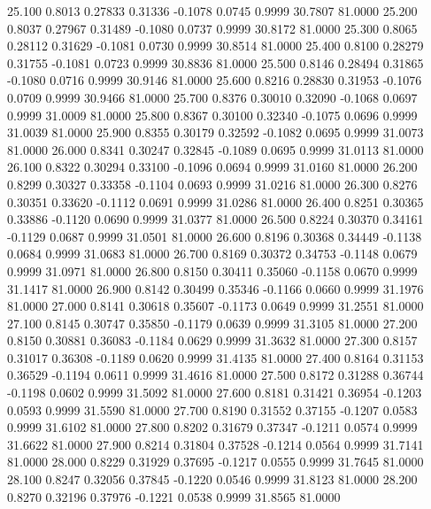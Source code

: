   25.100   0.8013   0.27833   0.31336  -0.1078   0.0745   0.9999  30.7807  81.0000
  25.200   0.8037   0.27967   0.31489  -0.1080   0.0737   0.9999  30.8172  81.0000
  25.300   0.8065   0.28112   0.31629  -0.1081   0.0730   0.9999  30.8514  81.0000
  25.400   0.8100   0.28279   0.31755  -0.1081   0.0723   0.9999  30.8836  81.0000
  25.500   0.8146   0.28494   0.31865  -0.1080   0.0716   0.9999  30.9146  81.0000
  25.600   0.8216   0.28830   0.31953  -0.1076   0.0709   0.9999  30.9466  81.0000
  25.700   0.8376   0.30010   0.32090  -0.1068   0.0697   0.9999  31.0009  81.0000
  25.800   0.8367   0.30100   0.32340  -0.1075   0.0696   0.9999  31.0039  81.0000
  25.900   0.8355   0.30179   0.32592  -0.1082   0.0695   0.9999  31.0073  81.0000
  26.000   0.8341   0.30247   0.32845  -0.1089   0.0695   0.9999  31.0113  81.0000
  26.100   0.8322   0.30294   0.33100  -0.1096   0.0694   0.9999  31.0160  81.0000
  26.200   0.8299   0.30327   0.33358  -0.1104   0.0693   0.9999  31.0216  81.0000
  26.300   0.8276   0.30351   0.33620  -0.1112   0.0691   0.9999  31.0286  81.0000
  26.400   0.8251   0.30365   0.33886  -0.1120   0.0690   0.9999  31.0377  81.0000
  26.500   0.8224   0.30370   0.34161  -0.1129   0.0687   0.9999  31.0501  81.0000
  26.600   0.8196   0.30368   0.34449  -0.1138   0.0684   0.9999  31.0683  81.0000
  26.700   0.8169   0.30372   0.34753  -0.1148   0.0679   0.9999  31.0971  81.0000
  26.800   0.8150   0.30411   0.35060  -0.1158   0.0670   0.9999  31.1417  81.0000
  26.900   0.8142   0.30499   0.35346  -0.1166   0.0660   0.9999  31.1976  81.0000
  27.000   0.8141   0.30618   0.35607  -0.1173   0.0649   0.9999  31.2551  81.0000
  27.100   0.8145   0.30747   0.35850  -0.1179   0.0639   0.9999  31.3105  81.0000
  27.200   0.8150   0.30881   0.36083  -0.1184   0.0629   0.9999  31.3632  81.0000
  27.300   0.8157   0.31017   0.36308  -0.1189   0.0620   0.9999  31.4135  81.0000
  27.400   0.8164   0.31153   0.36529  -0.1194   0.0611   0.9999  31.4616  81.0000
  27.500   0.8172   0.31288   0.36744  -0.1198   0.0602   0.9999  31.5092  81.0000
  27.600   0.8181   0.31421   0.36954  -0.1203   0.0593   0.9999  31.5590  81.0000
  27.700   0.8190   0.31552   0.37155  -0.1207   0.0583   0.9999  31.6102  81.0000
  27.800   0.8202   0.31679   0.37347  -0.1211   0.0574   0.9999  31.6622  81.0000
  27.900   0.8214   0.31804   0.37528  -0.1214   0.0564   0.9999  31.7141  81.0000
  28.000   0.8229   0.31929   0.37695  -0.1217   0.0555   0.9999  31.7645  81.0000
  28.100   0.8247   0.32056   0.37845  -0.1220   0.0546   0.9999  31.8123  81.0000
  28.200   0.8270   0.32196   0.37976  -0.1221   0.0538   0.9999  31.8565  81.0000
